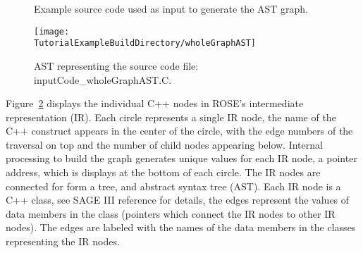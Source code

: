 {\begin{figure}[!h]
{\indent
{\mySmallFontSize

\begin{latexonly}
   
\end{latexonly}

\begin{htmlonly}
   
\end{htmlonly}

}
}
\caption{Example source code used as input to generate the AST graph.}
\label{Tutorial:exampleInputCode_WholeGraphAST}
\end{figure}

\begin{figure}
\texttt{[image: \\TutorialExampleBuildDirectory/wholeGraphAST]}
\caption{AST representing the source code file: inputCode\_wholeGraphAST.C.}
\label{tutorial:exampleOutputWholeGraphAST}
\end{figure}

   Figure~\ref{tutorial:exampleOutputWholeGraphAST} displays the individual
C++ nodes in ROSE's intermediate representation (IR).  Each circle represents
a single IR node, the name of the C++ construct appears in the center of the
circle, with the edge numbers of the traversal on top and the number of
child nodes appearing below.  Internal processing to build the graph generates
unique values for each IR node, a pointer address, which is displays at the bottom
of each circle.  The IR nodes are connected for form a tree, and abstract syntax
tree (AST). Each IR node is a C++ class, see SAGE III reference for details,
the edges represent the values of data members in the class (pointers which connect
the IR nodes to other IR nodes).  The edges are labeled with the names of the 
data members in the classes representing the IR nodes.
}

